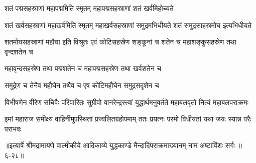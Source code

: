 \twolineshloka
{शतं पद्मसहस्राणां महापद्ममिति स्मृतम्}
{महापद्मसहस्राणां शतं खर्वमिहोच्यते} %

\threelineshloka
{शतं खर्वसहस्राणां महाखर्वमिति स्मृतम्}
{महाखर्वसहस्राणां समुद्रमभिधीयते}
{शतं समुद्रसाहस्रमोघ इत्यभिधीयते} %

\threelineshloka
{शतमोघसहस्राणां महौघा इति विश्रुतः}
{एवं कोटिसहस्रेण शङ्कूनां च शतेन च}
{महाशङ्कुसहस्रेण तथा वृन्दशतेन च} %

\twolineshloka
{महावृन्दसहस्रेण तथा पद्मशतेन च}
{महापद्मसहस्रेण तथा खर्वशतेन च} %

\onelineshloka
{समुद्रेण च तेनैव महौघेन तथैव च एष कोटिमहौघेन समुद्रसदृशेन च} %

\threelineshloka
{विभीषणेन वीरेण सचिवैः परिवारितः}
{सुग्रीवो वानरेन्द्रस्त्वां युद्धार्थमनुवर्तते}
{महाबलवृतो नित्यं महाबलपराक्रमः} %

\twolineshloka
{इमां महाराज समीक्ष्य वाहिनीमुपस्थितां प्रज्वलितग्रहोपमाम्}
{ततः प्रयत्नः परमो विधीयतां यथा जयः स्यान्न परैः पराभवः} %


॥इत्यार्षे श्रीमद्रामायणे वाल्मीकीये आदिकाव्ये युद्धकाण्डे मैन्दादिपराक्रमाख्यानम् नाम अष्टाविंशः सर्गः ॥६-२८॥
